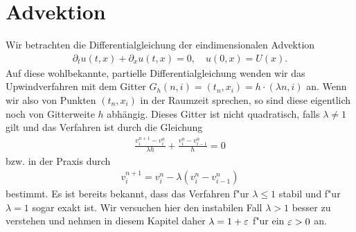 \section{Advektion}

Wir betrachten die Differentialgleichung der eindimensionalen Advektion
\begin{align}\label{eq:adv:pde}
\partial_t u(t, x) + \partial_x u(t, x) = 0, \quad u(0, x) = U(x).
\end{align}
Auf diese wohlbekannte, partielle Differentialgleichung wenden wir das Upwindverfahren mit dem Gitter $G_h(n,i) = (t_n, x_i) = h \cdot (\lambda n, i)$ an.
Wenn wir also von Punkten $(t_n, x_i)$ in der Raumzeit sprechen, so sind diese eigentlich noch von Gitterweite $h$ abhängig. 
Dieses Gitter ist nicht quadratisch, falls $\lambda \neq 1$ gilt und das Verfahren ist durch die Gleichung
\begin{align}\label{eq:adv:scheme_rechnung}
\frac {v^{n+1}_i - v^n_i} {\lambda h} + \frac {v^n_i - v^n_{i-1}} h = 0
\end{align}
bzw. in der Praxis durch
\begin{align}\label{eq:adv:scheme}
v^{n+1}_i = v^n_i - \lambda (v^n_i - v^n_{i-1})
\end{align}
bestimmt.
Es ist bereits bekannt, dass das Verfahren f"ur $\lambda \leq 1$ stabil und f"ur $\lambda = 1$ sogar exakt ist.
Wir versuchen hier den instabilen Fall $\lambda > 1$ besser zu verstehen und nehmen in diesem Kapitel daher $\lambda = 1 + \varepsilon$ f"ur ein $\varepsilon > 0$ an.



